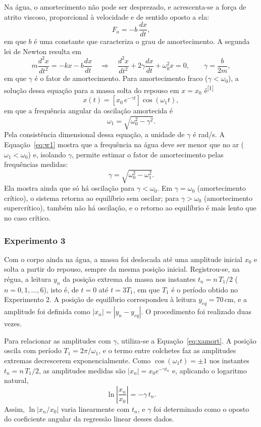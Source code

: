 \documentclass[12pt, a4paper]{article}
\newcommand{\un}[1]{\,\mathrm{#1}}
\newcommand{\cita}[1]{\textsuperscript{[#1]}}
\begin{document}
Na água, o amortecimento não pode ser desprezado, e acrescenta-se a força de atrito viscoso, proporcional à velocidade e de sentido oposto a ela:
\[
F_a=-b\,\frac{dx}{dt},
\]
em que $b$ é uma constante que caracteriza o grau de amortecimento. A segunda lei de Newton resulta em
\[
m\frac{d^2x}{dt^2}=-kx-b\frac{dx}{dt}
\quad\Longrightarrow\quad
\frac{d^2x}{dt^2}+2\gamma\frac{dx}{dt}+\omega_0^2x=0,
\qquad
\gamma=\frac{b}{2m},
\]
em que $\gamma$ é o fator de amortecimento. Para amortecimento fraco ($\gamma<\omega_0$), a solução dessa equação para a massa solta do repouso em $x=x_0$ é\cita{1}
\begin{equation}
x(t)=\left[x_0\,e^{-\gamma t}\right]\cos(\omega_1 t),
\label{eq:xamort}
\end{equation}
em que a frequência angular da oscilação amortecida é
\begin{equation}
\omega_1=\sqrt{\omega_0^2-\gamma^2}.
\label{eq:w1}
\end{equation}
Pela consistência dimensional dessa equação, a unidade de $\gamma$ é rad/s. A Equação~\eqref{eq:w1} mostra que a frequência na água deve ser menor que no ar ($\omega_1<\omega_0$) e, isolando $\gamma$, permite estimar o fator de amortecimento pelas frequências medidas:
\begin{equation}
\gamma=\sqrt{\omega_0^2-\omega_1^2}.
\label{eq:gw}
\end{equation}
Ela mostra ainda que só há oscilação para $\gamma<\omega_0$. Em $\gamma=\omega_0$ (amortecimento crítico), o sistema retorna ao equilíbrio sem oscilar; para $\gamma>\omega_0$ (amortecimento supercrítico), também não há oscilação, e o retorno ao equilíbrio é mais lento que no caso crítico.

\subsubsection{Experimento 3}

Com o corpo ainda na água, a massa foi deslocada até uma amplitude inicial $x_0$ e solta a partir do repouso, sempre da mesma posição inicial. Registrou-se, na régua, a leitura $y_n$ da posição extrema da massa nos instantes $t_n=n\,T_1/2$ ($n=0,1,\dots,6$), isto é, de $t=0$ até $t=3T_1$, em que $T_1$ é o período obtido no Experimento 2. A posição de equilíbrio correspondeu à leitura $y_{eq}=70\un{cm}$, e a amplitude foi definida como $|x_n|=|y_n-y_{eq}|$. O procedimento foi realizado duas vezes.

Para relacionar as amplitudes com $\gamma$, utiliza-se a Equação~\eqref{eq:xamort}. A posição oscila com período $T_1=2\pi/\omega_1$, e o termo entre colchetes faz as amplitudes extremas decrescerem exponencialmente. Como $\cos(\omega_1t)=\pm1$ nos instantes $t_n=n\,T_1/2$, as amplitudes medidas são $|x_n|=x_0e^{-\gamma t_n}$ e, aplicando o logaritmo natural,
\begin{equation}
\ln\left|\frac{x_n}{x_0}\right|=-\gamma\,t_n.
\label{eq:ln}
\end{equation}
Assim, $\ln|x_n/x_0|$ varia linearmente com $t_n$, e $\gamma$ foi determinado como o oposto do coeficiente angular da regressão linear desses dados.
\end{document}
